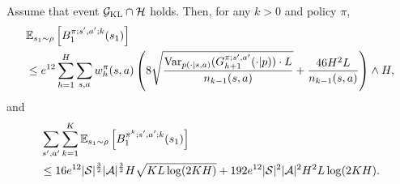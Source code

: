 \begin{lemma}\label{lemma:ub_B}
	Assume that event $\mathcal{G}_{\textup{KL}} \cap \mathcal{H}$ holds. Then, for any $k>0$ and policy $\pi$,
	\begin{align*}
		&\mathbb{E}_{s_1 \sim \rho}\left[ B^{\pi;s',a';k}_1(s_1) \right] 
		\\
		&\leq e^{12} \sum_{h=1}^{H} \sum_{s,a}  w^{\pi}_h(s,a)  \left(  8  \sqrt{ \frac{\textup{Var}_{p(\cdot|s,a)}(G^{\pi;s',a'}_{h+1}(\cdot|p)) \cdot L}{n_{k-1}(s,a)} }  + \frac{46  H^2L}{n_{k-1}(s,a)}  \right) \wedge H ,
	\end{align*}
	and
	\begin{align*}
		&\sum_{s',a'} \sum_{k=1}^{K}  \mathbb{E}_{s_1 \sim \rho}\left[ B^{\pi^k;s',a';k}_1(s_1) \right] 
		\\
		&\leq 16 e^{12} |\mathcal{S}|^{\frac{3}{2}} |\mathcal{A}|^{\frac{3}{2}} H \sqrt{K L \log(2KH) } 
		+ 192 e^{12} |\mathcal{S}|^2 |\mathcal{A}|^2 H^2 L \log(2KH) .
	\end{align*}
\end{lemma}
